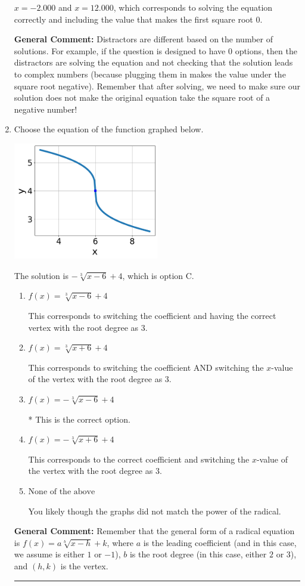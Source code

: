 \documentclass{extbook}[14pt]
\newcommand{\litem}[1]{\item #1

\rule{\textwidth}{0.4pt}}
\begin{document}
\begin{enumerate}
{\begin{enumerate}[label=\Alph*.]
$x = -2.000$ and $x = 12.000$, which corresponds to solving the equation correctly and including the value that makes the first square root 0.
\end{enumerate}

\textbf{General Comment:} Distractors are different based on the number of solutions. For example, if the question is designed to have 0 options, then the distractors are solving the equation and not checking that the solution leads to complex numbers (because plugging them in makes the value under the square root negative). Remember that after solving, we need to make sure our solution does not make the original equation take the square root of a negative number!
}
\litem{
Choose the equation of the function graphed below.

\begin{center}
    \includegraphics[width=0.5\textwidth]{../Figures/radicalGraphToEquationC.png}
\end{center}




The solution is \( - \sqrt[3]{x - 6} + 4 \), which is option C.\begin{enumerate}[label=\Alph*.]
\item \( f(x) = \sqrt[3]{x - 6} + 4 \)

This corresponds to switching the coefficient and having the correct vertex with the root degree as $3$.
\item \( f(x) = \sqrt[3]{x + 6} + 4 \)

This corresponds to switching the coefficient AND switching the $x$-value of the vertex with the root degree as $3$.
\item \( f(x) = - \sqrt[3]{x - 6} + 4 \)

* This is the correct option.
\item \( f(x) = - \sqrt[3]{x + 6} + 4 \)

This corresponds to the correct coefficient and switching the $x$-value of the vertex with the root degree as $3$.
\item \( \text{None of the above} \)

You likely though the graphs did not match the power of the radical.
\end{enumerate}

\textbf{General Comment:} Remember that the general form of a radical equation is $ f(x) = a \sqrt[b]{x - h} + k$, where $a$ is the leading coefficient (and in this case, we assume is either $1$ or $-1$), $b$ is the root degree (in this case, either $2$ or $3$), and $(h, k)$ is the vertex.
}
\end{enumerate}
\end{document}
